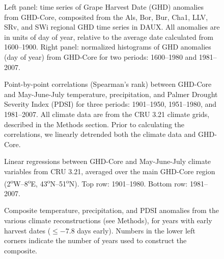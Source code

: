\documentclass[final]{nature}
\begin{document}
\begin{figure}
\caption{Left panel: time series of Grape Harvest Date (GHD) anomalies from GHD-Core, composited from the Als, Bor, Bur, Cha1, LLV, SRv, and SWi regional GHD time series in DAUX. All anomalies are in units of day of year, relative to the average date calculated from 1600--1900. Right panel: normalized histograms of GHD anomalies (day of year) from GHD-Core for two periods: 1600--1980 and 1981--2007.}
\end{figure}

\begin{figure}
\caption{Point-by-point correlations (Spearman's rank) between GHD-Core and May-June-July temperature, precipitation, and Palmer Drought Severity Index (PDSI) for three periods: 1901--1950, 1951--1980, and 1981--2007. All climate data are from the CRU 3.21 climate grids, described in the Methods section. Prior to calculating the correlations, we linearly detrended both the climate data and GHD-Core.}
\end{figure}

\begin{figure}
\caption{Linear regressions between GHD-Core and May-June-July climate variables from CRU 3.21, averaged over the main GHD-Core region (2\textsuperscript{o}W--8\textsuperscript{o}E, 43\textsuperscript{o}N--51\textsuperscript{o}N). Top row: 1901--1980. Bottom row: 1981--2007.}
\end{figure}

\begin{figure}
\caption{Composite temperature, precipitation, and PDSI anomalies from the various climate reconstructions (see Methods), for years with early harvest dates ($\le-7.8$ days early). Numbers in the lower left corners indicate the number of years used to construct the composite.}
\end{figure}

\end{document}
